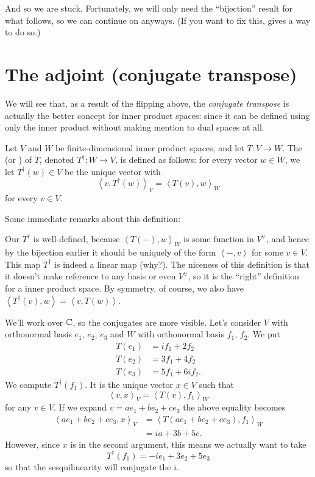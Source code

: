 And so we are stuck.
Fortunately, we will only need the ``bijection'' result
for what follows, so we can continue on anyways.
(If you want to fix this, 
gives a way to do so.)


\section{The adjoint (conjugate transpose)}
We will see that, as a result of the flipping above,
the \emph{conjugate transpose} is actually the better concept
for inner product spaces: since it can be defined using only the inner product
without making mention to dual spaces at all.
\begin{definition}
	Let $V$ and $W$ be finite-dimensional inner product spaces,
	and let $T \colon V \to W$.
	The  (or )
	of $T$, denoted $T^\dagger \colon W \to V$,
	is defined as follows: for every vector $w \in W$,
	we let $T^\dagger(w) \in V$ be the unique vector with
	\[ \left< v, T^\dagger(w) \right>_V = \left< T(v), w \right>_W \]
	for every $v \in V$.
\end{definition}

Some immediate remarks about this definition:
\begin{itemize}
\ii Our $T^\dagger$ is well-defined,
because $\left< T(-), w \right>_W$ is some function in $V^\vee$,
and hence by the bijection earlier
it should be uniquely of the form $\left< -, v \right>$ for some $v \in V$.
\ii This map $T^\dagger$ is indeed a linear map (why?).
\ii The niceness of this definition is that it doesn't
make reference to any basis or even $V^\vee$,
so it is the ``right'' definition for a inner product space.
\ii By symmetry, of course, we also have
$\left< T^\dagger(v), w \right> = \left< v, T(w)\right>$.
\end{itemize}

\begin{example}
	We'll work over $\mathbb C$, so the conjugates are more visible.
	Let's consider $V$ with orthonormal basis $e_1$, $e_2$, $e_3$
	and $W$ with orthonormal basis $f_1$, $f_2$.
	We put
	\begin{align*}
		T(e_1) &= if_1 + 2f_2 \\
		T(e_2) &= 3f_1 + 4f_2 \\
		T(e_3) &= 5f_1 + 6if_2.
	\end{align*}
	We compute $T^\dagger(f_1)$.
	It is the unique vector $x \in V$ such that
	\[ \left< v, x \right>_V = \left< T(v), f_1 \right>_W \]
	for any $v \in V$.
	If we expand $v = ae_1 + be_2 + ce_3$ the above equality becomes
	\begin{align*}
		\left< ae_1 + be_2 + ce_3, x \right>_V
		&= \left< T(ae_1 + be_2 + ce_3), f_1 \right>_W \\
		&= ia + 3b + 5c.
	\end{align*}
	However, since $x$ is in the second argument,
	this means we actually want to take
	\[ T^\dagger(f_1) = -ie_1 + 3e_2 + 5e_3 \]
	so that the sesquilinearity will conjugate the $i$.
\end{example}


